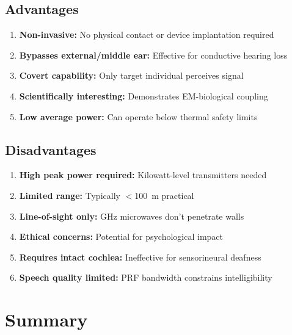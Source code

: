 \subsection*{Advantages}

\begin{enumerate}
\item \textbf{Non-invasive:} No physical contact or device implantation required
\item \textbf{Bypasses external/middle ear:} Effective for conductive hearing loss
\item \textbf{Covert capability:} Only target individual perceives signal
\item \textbf{Scientifically interesting:} Demonstrates EM-biological coupling
\item \textbf{Low average power:} Can operate below thermal safety limits
\end{enumerate}

\subsection*{Disadvantages}

\begin{enumerate}
\item \textbf{High peak power required:} Kilowatt-level transmitters needed
\item \textbf{Limited range:} Typically $<$100~m practical
\item \textbf{Line-of-sight only:} GHz microwaves don't penetrate walls
\item \textbf{Ethical concerns:} Potential for psychological impact
\item \textbf{Requires intact cochlea:} Ineffective for sensorineural deafness
\item \textbf{Speech quality limited:} PRF bandwidth constrains intelligibility
\end{enumerate}

\section{Summary}

